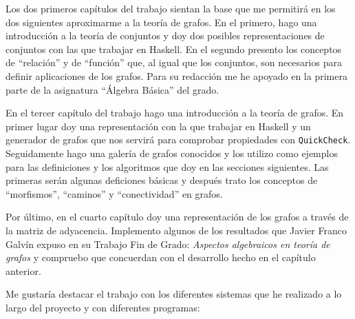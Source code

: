 Los dos primeros capítulos del trabajo sientan la base que me permitirá en los
dos siguientes aproximarme a la teoría de grafos. En el primero, hago
una introducción a la teoría de conjuntos y doy dos posibles representaciones
de conjuntos con las que trabajar en Haskell. En el segundo presento los
conceptos de ``relación'' y de ``función'' que, al igual que los conjuntos, son
necesarios para definir aplicaciones de los grafos. Para su redacción me he 
apoyado en la primera parte de la asignatura ``Álgebra Básica'' del grado.

En el tercer capítulo del trabajo hago una introducción a la teoría de grafos.
En primer lugar doy una representación con la que trabajar en Haskell y un
generador de grafos que nos servirá para comprobar propiedades con 
\texttt{QuickCheck}. Seguidamente hago una galería de grafos conocidos y los
utilizo como ejemplos para las definiciones y los algoritmos que doy en las 
secciones siguientes. Las primeras serán algunas deficiones básicas y después
trato los conceptos de ``morfismos'', ``caminos'' y ``conectividad'' en 
grafos.

Por último, en el cuarto capítulo doy una representación de los grafos a través
de la matriz de adyacencia. Implemento algunos de los resultados que Javier 
Franco Galvín expuso en su Trabajo Fin de Grado: \textit{Aspectos algebraicos 
en teoría de grafos} y compruebo que concuerdan con el desarrollo hecho en el 
capítulo anterior.

Me gustaría destacar el trabajo con los diferentes sistemas que he realizado
a lo largo del proyecto y con diferentes programas: 
 
